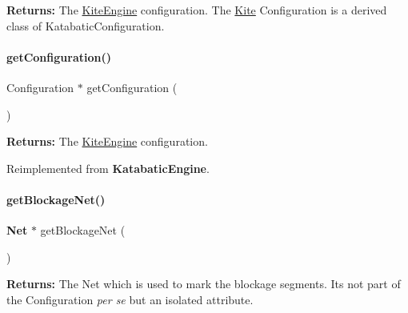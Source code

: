 {\bfseries Returns\+:} The \mbox{\hyperlink{classKite_1_1KiteEngine}{Kite\+Engine}} configuration. The \mbox{\hyperlink{namespaceKite}{Kite}} Configuration is a derived class of Katabatic\+Configuration. \mbox{\label{classKite_1_1KiteEngine_a9a7fbadfe526875680f698c76adfb128}} 
\paragraph{\texorpdfstring{get\+Configuration()}{getConfiguration()}}
{\footnotesize\ttfamily Configuration $\ast$ get\+Configuration (\begin{DoxyParamCaption}{ }\end{DoxyParamCaption})\hspace{0.3cm}{\ttfamily [virtual]}}

{\bfseries Returns\+:} The \mbox{\hyperlink{classKite_1_1KiteEngine}{Kite\+Engine}} configuration. 

Reimplemented from \textbf{ Katabatic\+Engine}.

\mbox{\label{classKite_1_1KiteEngine_aef6f41b0e8265ad574d1797f46ab9fa8}} 
\paragraph{\texorpdfstring{get\+Blockage\+Net()}{getBlockageNet()}}
{\footnotesize\ttfamily \textbf{ Net} $\ast$ get\+Blockage\+Net (\begin{DoxyParamCaption}{ }\end{DoxyParamCaption})\hspace{0.3cm}{\ttfamily [inline]}}

{\bfseries Returns\+:} The Net which is used to mark the blockage segments. It\textquotesingle{}s not part of the Configuration {\itshape per se} but an isolated attribute. \mbox{\label{classKite_1_1KiteEngine_ae88a4ccf0189655c785df38e5d75155c}} 
